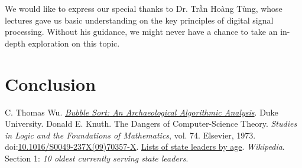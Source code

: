 \documentclass[a4paper,12pt]{article}
\begin{document}
We would like to express our special thanks to Dr. Trần Hoàng Tùng,
whose lectures gave us basic understanding on the key principles of
digital signal processing.  Without his guidance, we might never
have a chance to take an in-depth exploration on this topic.
\pagebreak

\section{Conclusion}
\pagebreak

\begin{thebibliography}{99}
   C. Thomas Wu.
    \emph{\href{https://users.cs.duke.edu/~ola/bubble/bubble.html}{Bubble Sort: An Archaeological Algorithmic Analysis}}.
    Duke University.
   Donald E. Knuth.  The Dangers of Computer-Science Theory.
    \emph{Studies in Logic and the Foundations of Mathematics}, vol. 74.
    Elsevier, 1973.
    doi:\href{https://doi.org/10.1016/S0049-237X(09)70357-X}{10.1016/S0049-237X(09)70357-X}.
   \href{https://en.wikipedia.org/wiki/Lists_of_state_leaders_by_age#10_oldest_currently_serving_state_leaders}{Lists of state leaders by age}.
    \emph{Wikipedia}.
    Section 1: \emph{10 oldest currently serving state leaders}.
\end{thebibliography}
\end{document}
